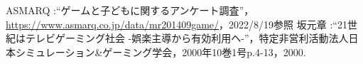 \documentclass[twocolumn,10pt,a4j]{ltjsarticle}
\begin{document}

\begin{thebibliography}{99}
 ASMARQ :``ゲームと子どもに関するアンケート調査''，\url{https://www.asmarq.co.jp/data/mr201409game/}，2022/8/19参照
 坂元章 :``21世紀はテレビゲーミング社会 -娯楽主導から有効利用ヘ-''，特定非営利活動法人日本シミュレーション\&ゲーミング学会，2000年10巻1号p.4-13，2000.
\end{thebibliography}
\end{document}
